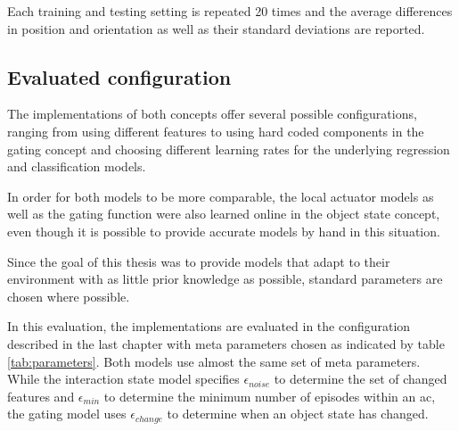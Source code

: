 Each training and testing setting is repeated 20 times and the average differences in position and orientation as well as their standard deviations are reported. 

\subsection{Evaluated configuration}

The implementations of both concepts offer several possible configurations, ranging from using different features to using hard coded components in the gating concept and choosing different learning rates for the underlying regression and classification models. 

In order for both models to be more comparable, the local actuator models as well as the gating function were also learned online in the object state concept, even though it is possible to provide accurate models by hand in this situation.

Since the goal of this thesis was to provide models that adapt to their environment with as little prior knowledge as possible, standard parameters are chosen where possible. 

In this evaluation, the implementations are evaluated in the configuration described in the last chapter with meta parameters chosen as indicated by table \ref{tab:parameters}.
Both models use almost the same set of meta parameters. While the interaction state model specifies $\epsilon_{noise}$ to determine the set of changed features and $\epsilon_{min}$ to determine the minimum number of episodes within an \gls{ac}, the gating model uses $\epsilon_{change}$ to determine when an object state has changed.


